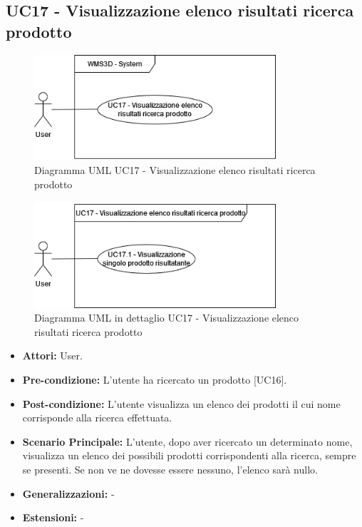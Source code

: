 \subsection{UC17 - Visualizzazione elenco risultati ricerca prodotto}
\begin{figure}[H]
  \centering
  \includegraphics[width=0.8\textwidth]{UC_diagrams_11-20/UC17_sys.drawio.png}
   \caption{Diagramma UML UC17 - Visualizzazione elenco risultati ricerca prodotto}
\end{figure}
\begin{figure}[H]
  \centering
  \includegraphics[width=0.8\textwidth]{UC_diagrams_11-20/UC17.drawio.png}
   \caption{Diagramma UML in dettaglio UC17 - Visualizzazione elenco risultati ricerca prodotto}
\end{figure}
\begin{itemize}
    \item \textbf{Attori:} User.
    \item \textbf{Pre-condizione:} L'utente ha ricercato un prodotto [UC16].
    \item \textbf{Post-condizione:} L'utente visualizza un elenco dei prodotti il cui nome corrisponde alla ricerca effettuata.
    \item \textbf{Scenario Principale:} L'utente, dopo aver ricercato un determinato nome, visualizza un elenco dei possibili prodotti corrispondenti alla ricerca, sempre se presenti. Se non ve ne dovesse essere nessuno, l'elenco sarà nullo.
    \item \textbf{Generalizzazioni:} -
    \item \textbf{Estensioni:} -
\end{itemize}



